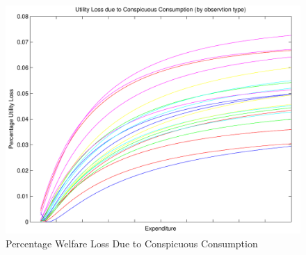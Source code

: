 \documentclass{article}
\begin{document}
\begin{figure}
	\begin{center}
		\includegraphics[scale=.8]{pics/wellos_cropped.pdf}
	\end{center}
	\caption{Percentage Welfare Loss Due to Conspicuous Consumption}
	\label{fig:wellos}
\end{figure}



\end{document}
